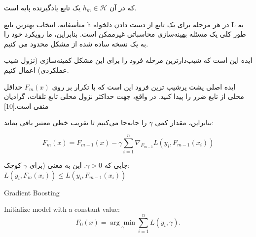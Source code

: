 \documentclass[12pt,a4paper,BCOR=.7cm,headsepline,bibliography=totoc]{report}
\begin{document}
که در آن ${\displaystyle h_{m}\in {\mathcal {H}}}$ یک تابع یادگیرنده پایه است.

متأسفانه، انتخاب بهترین تابع h در هر مرحله برای یک تابع از دست دادن دلخواه L به طور کلی یک مسئله بهینه‌سازی محاسباتی غیرممکن است. بنابراین، ما رویکرد خود را به یک نسخه ساده شده از مشکل محدود می کنیم.

ایده این است که شیب‌دارترین مرحله فرود را برای این مشکل کمینه‌سازی (نزول شیب عملکردی) اعمال کنیم.

ایده اصلی پشت پرشیب ترین فرود این است که با تکرار بر روی ${\displaystyle F_{m}(x)}$ حداقل محلی از تابع ضرر را پیدا کنید. در واقع، جهت حداکثر نزول محلی تابع تلفات، گرادیان منفی است.[10]

بنابراین، مقدار کمی ${\displaystyle \gamma }$ را جابه‌جا می‌کنیم تا تقریب خطی معتبر باقی بماند:

$${\displaystyle F_{m}(x)=F_{m-1}(x)-\gamma \sum _{i=1}^{n}{\nabla _{F_{m-1}}L(y_ {i},F_{m-1}(x_{i}))}}$$


جایی که ${\displaystyle \gamma >0}$. این به معنی (برای ${\displaystyle \gamma }$ کوچک: ${\displaystyle L(y_{i},F_{m}(x_{i}))\leq L(y_{i},F_{m-1} (x_{i}))}$
\begin{latin}
\begin{algorithm}[H]
\caption{Gradient Boosting}\label{alg:two}
Initialize model with a constant value:\\
$${\displaystyle F_{0}(x)={\underset {\gamma }{\arg \min }}\sum _{i=1}^{n}L(y_{i},\gamma ).}$$
\end{algorithm}
\end{latin}
\end{document}
